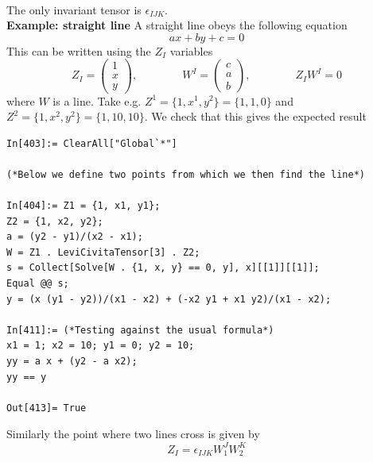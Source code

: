 \documentclass[a4paper,12pt]{article}
\begin{document}
\\
The only invariant tensor is $\epsilon_{IJK}$.
\\
\textbf{Example: straight line}
A straight line obeys the following equation
\begin{equation}
ax+by+c=0
\end{equation}
This can be written using the $Z_I$ variables
\begin{equation}
Z_I=\begin{pmatrix}
	1\\ x\\ y
\end{pmatrix},\qquad \qquad W^I=\begin{pmatrix}
c \\ a \\ b
\end{pmatrix},\qquad \qquad Z_I W^I=0
\end{equation}
where $W$ is a line. Take e.g. $Z^1=\{1,x^1,y^2\}=\{1,1,0\}$ and $Z^2=\{1,x^2,y^2\}=\{1,10,10\}$.
We check that this gives the expected result
\begin{lstlisting}
In[403]:= ClearAll["Global`*"]

(*Below we define two points from which we then find the line*)

In[404]:= Z1 = {1, x1, y1};
Z2 = {1, x2, y2};
a = (y2 - y1)/(x2 - x1);
W = Z1 . LeviCivitaTensor[3] . Z2;
s = Collect[Solve[W . {1, x, y} == 0, y], x][[1]][[1]];
Equal @@ s;
y = (x (y1 - y2))/(x1 - x2) + (-x2 y1 + x1 y2)/(x1 - x2);

In[411]:= (*Testing against the usual formula*)
x1 = 1; x2 = 10; y1 = 0; y2 = 10;
yy = a x + (y2 - a x2);
yy == y

Out[413]= True
\end{lstlisting}
Similarly the point where two lines cross is given  by \begin{equation}
Z_I=\epsilon_{IJK}W_1^JW_2^K
\end{equation}
\end{document}
